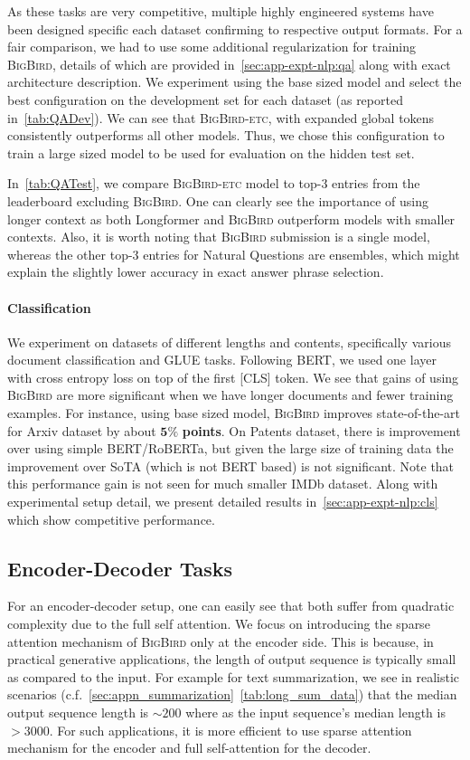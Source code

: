 As these tasks are very competitive, multiple highly engineered systems have been designed specific each dataset confirming to respective output formats. For a fair comparison, we had to use some additional regularization for training \textsc{BigBird}, details of which are provided in~\ref{sec:app-expt-nlp:qa} along with exact architecture description. We experiment using the base sized model and select the best configuration on the development set for each dataset (as reported in~\ref{tab:QADev}).
We can see that \textsc{BigBird}-\textsc{etc}, with expanded global tokens consistently outperforms all other models. Thus, we chose this configuration to train a large sized model to be used for evaluation on the hidden test set.

In~\ref{tab:QATest}, we compare \textsc{BigBird}-\textsc{etc} model to top-3 entries from the leaderboard excluding \textsc{BigBird}. 
One can clearly see the importance of using longer context as both Longformer and \textsc{BigBird} outperform models with smaller contexts. Also, it is worth noting that \textsc{BigBird} submission is a single model, whereas the other top-3 entries for Natural Questions are  ensembles, which might explain the slightly lower accuracy in exact answer phrase selection.

\paragraph{Classification} 
We experiment on datasets of different lengths and contents, specifically various document classification and GLUE tasks. Following BERT, we used one layer with cross entropy loss on top of the first [CLS] token. We see that gains of using \textsc{BigBird} are more significant when we have longer documents and fewer training examples. For instance, using base sized model,
\textsc{BigBird} improves state-of-the-art for Arxiv dataset by about $\bm{5\%}$ \textbf{points}.
On Patents dataset, there is improvement over using simple BERT/RoBERTa, but given the large size of training data the improvement over SoTA (which is not BERT based) is not significant. Note that this performance gain is not seen for much smaller IMDb dataset. Along with experimental setup detail, we present detailed results in~\ref{sec:app-expt-nlp:cls} which show competitive performance.

\subsection{Encoder-Decoder Tasks}
\label{sec:seq2seq}
For an encoder-decoder setup, one can easily see that both suffer from quadratic complexity due to the full self attention. We focus on introducing the sparse attention mechanism of \textsc{BigBird} only at the encoder side. This is because, in practical generative applications, the length of output sequence is typically small as compared to the input. For example for text summarization, we see in realistic scenarios (c.f.~\ref{sec:appn_summarization}~\ref{tab:long_sum_data}) that the median output sequence length is $\sim 200$ where as the input sequence's median length is $>3000$. For such applications, it is more efficient to use sparse attention mechanism for the encoder and full self-attention for the decoder.

